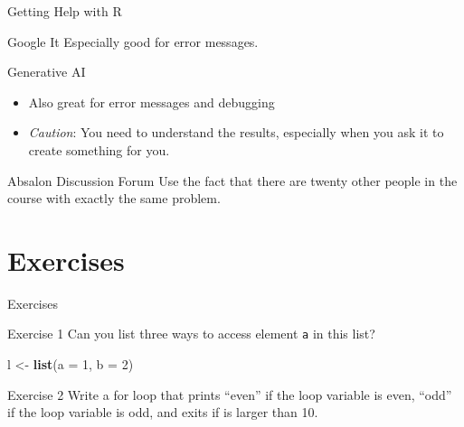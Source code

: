 \documentclass[
  ignorenonframetext,
  aspectratio=1610,
  onlytextwidth]{beamer}
\newenvironment{Shaded}{\begin{snugshade}}{\end{snugshade}}
\newcommand{\AttributeTok}[1]{\textcolor[rgb]{0.13,0.29,0.53}{#1}}
\newcommand{\DecValTok}[1]{\textcolor[rgb]{0.00,0.00,0.81}{#1}}
\newcommand{\FunctionTok}[1]{\textcolor[rgb]{0.13,0.29,0.53}{\textbf{#1}}}
\newcommand{\NormalTok}[1]{#1}
\newcommand{\OtherTok}[1]{\textcolor[rgb]{0.56,0.35,0.01}{#1}}
\providecommand{\tightlist}{}
\begin{document}
\begin{frame}{Getting Help with R}
\label{getting-help-with-r}
\begin{block}{Google It}
\label{google-it}
Especially good for error messages.

\pause
\end{block}

\begin{block}{Generative AI}
\label{generative-ai-1}
\begin{itemize}[<+->]
\tightlist
\item
  Also great for error messages and debugging
\item
  \emph{Caution}: You need to understand the results, especially when
  you ask it to create something for you.
\end{itemize}

\pause
\end{block}

\begin{block}{Absalon Discussion Forum}
\label{absalon-discussion-forum}
Use the fact that there are twenty other people in the course with
exactly the same problem.
\end{block}
\end{frame}

\section{Exercises}\label{exercises}

\begin{frame}[fragile]{Exercises}
\begin{block}{Exercise 1}
\label{exercise-1}
Can you list three ways to access element \texttt{a} in this list?

\begin{Shaded}
\begin{Highlighting}[]
\NormalTok{l }\OtherTok{\textless{}{-}} \FunctionTok{list}\NormalTok{(}\AttributeTok{a =} \DecValTok{1}\NormalTok{, }\AttributeTok{b =} \DecValTok{2}\NormalTok{)}
\end{Highlighting}
\end{Shaded}

\pause
\end{block}

\begin{block}{Exercise 2}
\label{exercise-2}
Write a for loop that prints ``even'' if the loop variable is even,
``odd'' if the loop variable is odd, and exits if is larger than 10.
\end{block}
\end{frame}
\end{document}
